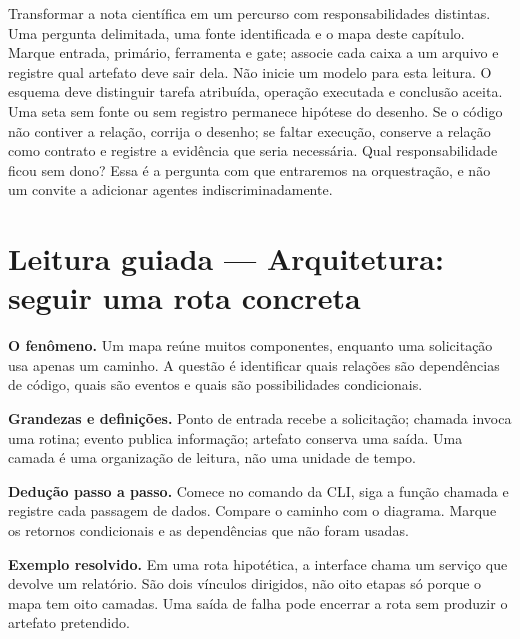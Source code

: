 \praticacore
{Transformar a nota científica em um percurso com responsabilidades distintas.}
{Uma pergunta delimitada, uma fonte identificada e o mapa deste capítulo.}
{Marque entrada, primário, ferramenta e gate; associe cada caixa a um arquivo e
registre qual artefato deve sair dela. Não inicie um modelo para esta leitura.}
{O esquema deve distinguir tarefa atribuída, operação executada e conclusão
aceita. Uma seta sem fonte ou sem registro permanece hipótese do desenho.}
{Se o código não contiver a relação, corrija o desenho; se faltar execução,
conserve a relação como contrato e registre a evidência que seria necessária.}
{Qual responsabilidade ficou sem dono? Essa é a pergunta com que entraremos
na orquestração, e não um convite a adicionar agentes indiscriminadamente.}

\section[Leitura guiada]{Leitura guiada — Arquitetura: seguir uma rota concreta}
\begin{descricao}
\textbf{O fenômeno.} Um mapa reúne muitos componentes, enquanto uma solicitação usa apenas um caminho. A questão é identificar quais relações são dependências de código, quais são eventos e quais são possibilidades condicionais.
\end{descricao}

\begin{definicao}
\textbf{Grandezas e definições.} Ponto de entrada recebe a solicitação; chamada invoca uma rotina; evento publica informação; artefato conserva uma saída. Uma camada é uma organização de leitura, não uma unidade de tempo.
\end{definicao}

\begin{metodo}
\textbf{Dedução passo a passo.} Comece no comando da CLI, siga a função chamada e registre cada passagem de dados. Compare o caminho com o diagrama. Marque os retornos condicionais e as dependências que não foram usadas.
\end{metodo}

\begin{resultado}
\textbf{Exemplo resolvido.} Em uma rota hipotética, a interface chama um serviço que devolve um relatório. São dois vínculos dirigidos, não oito etapas só porque o mapa tem oito camadas. Uma saída de falha pode encerrar a rota sem produzir o artefato pretendido.
\end{resultado}

